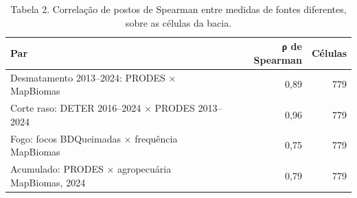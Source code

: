 \begin{table}
\caption{Tabela 2. Correlação de postos de Spearman entre medidas de fontes diferentes, sobre as células da bacia.}
\label{tab:04_perturbacao:xingu:concordancia}
\begin{tabular}{lrr}
\toprule
Par & ρ de Spearman & Células \\
\midrule
Desmatamento 2013–2024: PRODES × MapBiomas & 0,89 & 779 \\
Corte raso: DETER 2016–2024 × PRODES 2013–2024 & 0,96 & 779 \\
Fogo: focos BDQueimadas × frequência MapBiomas & 0,75 & 779 \\
Acumulado: PRODES × agropecuária MapBiomas, 2024 & 0,79 & 779 \\
\bottomrule
\end{tabular}
\end{table}
